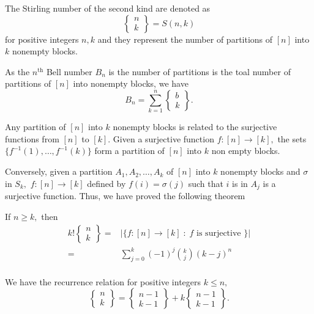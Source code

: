 \begin{definition}
	The Stirling number of the second kind are denoted as 
	$$ \begin{Bmatrix} n\\k \end{Bmatrix} = S(n,k)$$
	for positive integers $n,k$ and they represent the
	number of partitions of $[n]$ into $k$ nonempty blocks.
\end{definition}


\begin{remark}
	As the $n^\text{th}$ Bell number $B_n$ is the number of partitions is the toal number of partitions of $[n]$ into nonempty blocks, we have
	$$B_n = \sum_{k=1}^{n} \begin{Bmatrix} b\\k\end{Bmatrix}.$$ 
\end{remark}



Any partition of $[n]$ into $k$ nonempty blocks is related to the
surjective functions from $[n]$ to $[k].$ Given a surjective function
$f \colon [n] \to [k],$ the sets $\{ f^{-1}(1), \dotsc, f^{-1}(k)\}$
form a partition of $[n]$ into $k$ non empty blocks.

Conversely, given a partition $A_1, A_2, \dotsc, A_k$ of $[n]$ into $k$ nonempty blocks and $\sigma$ in $S_k,$ $f \colon [n] \to [k]$ defined by
$f(i) = \sigma(j)$ such that $i$ is in $A_{j}$ is a surjective function.
Thus, we have proved the following theorem
\begin{theorem}
	If $n \geq k,$ then 
	\begin{align*}
		k! \begin{Bmatrix} n\\k\end{Bmatrix}
		={}& \lvert \{ f\colon [n] \to [k] \; : \;
		f \text{ is surjective } \} \rvert \\
		={}& \sum_{j=0}^{k} (-1)^j \binom{k}{j} (k-j)^n\\
	\end{align*}
\end{theorem}


\begin{remark}
	We have the recurrence relation for positive integers $k \leq n,$
	$$ \begin{Bmatrix} n\\k\end{Bmatrix} = 
	\begin{Bmatrix}n-1\\k-1 \end{Bmatrix} + 
	k \begin{Bmatrix}n-1\\k-1 \end{Bmatrix}. $$
\end{remark}


